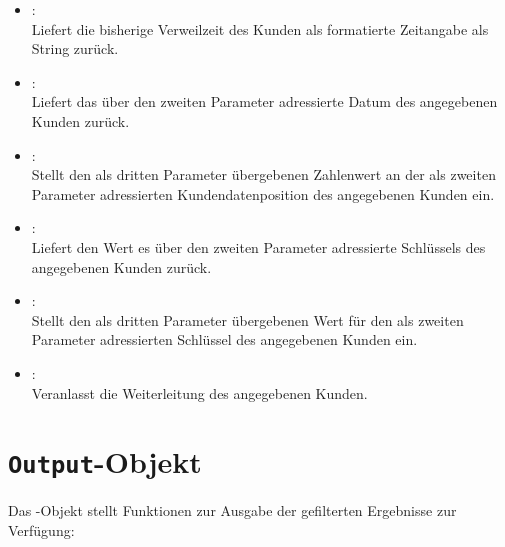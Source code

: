 \begin{itemize}
\item
{}:\\
Liefert die bisherige Verweilzeit des Kunden als formatierte Zeitangabe als String zurück.

\item
{}:\\
Liefert das über den zweiten Parameter adressierte Datum des angegebenen Kunden zurück.

\item
{}:\\
Stellt den als dritten Parameter übergebenen Zahlenwert an der als zweiten Parameter adressierten Kundendatenposition des angegebenen Kunden ein.

\item
{}:\\
Liefert den Wert es über den zweiten Parameter adressierte Schlüssels des angegebenen Kunden zurück.

\item
{}:\\
Stellt den als dritten Parameter übergebenen Wert für den als zweiten Parameter adressierten Schlüssel des angegebenen Kunden ein.

\item
{}:\\
Veranlasst die Weiterleitung des angegebenen Kunden.
	
\end{itemize}



\chapter{\texttt{Output}-Objekt}

Das -Objekt stellt Funktionen zur Ausgabe der gefilterten Ergebnisse zur Verfügung:

